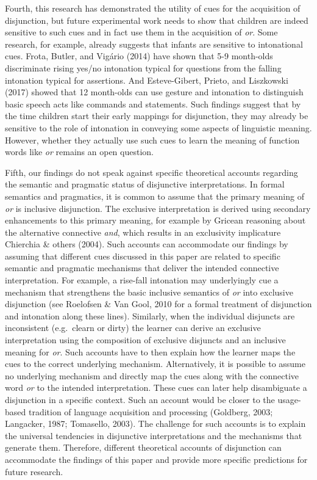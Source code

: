 \documentclass[
  english,
  ,man,floatsintext]{apa6}
\begin{document}
Fourth, this research has demonstrated the utility of cues for the acquisition of disjunction, but future experimental work needs to show that children are indeed sensitive to such cues and in fact use them in the acquisition of \emph{or}. Some research, for example, already suggests that infants are sensitive to intonational cues. Frota, Butler, and Vigário (2014) have shown that 5-9 month-olds discriminate rising yes/no intonation typical for questions from the falling intonation typical for assertions. And Esteve-Gibert, Prieto, and Liszkowski (2017) showed that 12 month-olds can use gesture and intonation to distinguish basic speech acts like commands and statements. Such findings suggest that by the time children start their early mappings for disjunction, they may already be sensitive to the role of intonation in conveying some aspects of linguistic meaning. However, whether they actually use such cues to learn the meaning of function words like \emph{or} remains an open question.

Fifth, our findings do not speak against specific theoretical accounts regarding the semantic and pragmatic status of disjunctive interpretations. In formal semantics and pragmatics, it is common to assume that the primary meaning of \emph{or} is inclusive disjunction. The exclusive interpretation is derived using secondary enhancements to this primary meaning, for example by Gricean reasoning about the alternative connective \emph{and}, which results in an exclusivity implicature Chierchia \& others (2004). Such accounts can accommodate our findings by assuming that different cues discussed in this paper are related to specific semantic and pragmatic mechanisms that deliver the intended connective interpretation. For example, a rise-fall intonation may underlyingly cue a mechanism that strengthens the basic inclusive semantics of \emph{or} into exclusive disjunction (see Roelofsen \& Van Gool, 2010 for a formal treatment of disjunction and intonation along these lines). Similarly, when the individual disjuncts are inconsistent (e.g.~clearn or dirty) the learner can derive an exclusive interpretation using the composition of exclusive disjuncts and an inclusive meaning for \emph{or}. Such accounts have to then explain how the learner maps the cues to the correct underlying mechanism. Alternatively, it is possible to assume no underlying mechanism and directly map the cues along with the connective word \emph{or} to the intended interpretation. These cues can later help disambiguate a disjunction in a specific context. Such an account would be closer to the usage-based tradition of language acquisition and processing (Goldberg, 2003; Langacker, 1987; Tomasello, 2003). The challenge for such accounts is to explain the universal tendencies in disjunctive interpretations and the mechanisms that generate them. Therefore, different theoretical accounts of disjunction can accommodate the findings of this paper and provide more specific predictions for future research.
\end{document}
